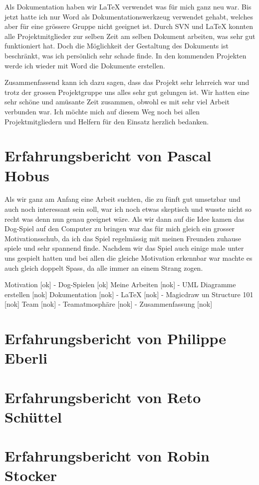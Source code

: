 \documentclass[12pt,halfparskip]{scrartcl}
\begin{document}
Als Dokumentation haben wir LaTeX verwendet was für mich ganz neu war. Bis jetzt hatte ich nur Word als Dokumentationswerkzeug verwendet gehabt, welches aber für eine grössere Gruppe nicht geeignet ist. Durch SVN und LaTeX konnten alle Projektmitglieder zur selben Zeit am selben Dokument arbeiten, was sehr gut funktioniert hat. Doch die Möglichkeit der Gestaltung des Dokuments ist beschränkt, was ich persönlich sehr schade finde. In den kommenden Projekten werde ich wieder mit Word die Dokumente erstellen.

Zusammenfassend kann ich dazu sagen, dass das Projekt sehr lehrreich war und trotz der grossen Projektgruppe uns alles sehr gut gelungen ist. Wir hatten eine sehr schöne und amüsante Zeit zusammen, obwohl es mit sehr viel Arbeit verbunden war. Ich möchte mich auf diesem Weg noch bei allen Projektmitgliedern und Helfern für den Einsatz herzlich bedanken.


\section{Erfahrungsbericht von Pascal Hobus}
Als wir ganz am Anfang eine Arbeit suchten, die zu fünft gut umsetzbar und auch noch interessant sein soll, war ich noch etwas skeptisch und wusste nicht so recht was denn nun genau geeignet wäre. Als wir dann auf die Idee kamen das Dog-Spiel auf den Computer zu bringen war das für mich gleich ein grosser Motivationsschub, da ich das Spiel regelmässig mit meinen Freunden zuhause spiele und sehr spannend finde. Nachdem wir das Spiel auch einige male unter uns gespielt hatten und bei allen die gleiche Motivation erkennbar war machte es auch gleich doppelt Spass, da alle immer an einem Strang zogen.


Motivation						[ok]
- Dog-Spielen					[ok]
Meine Arbeiten					[nok]
- UML Diagramme erstellen		[nok]
Dokumentation					[nok]
- LaTeX							[nok]
- Magicdraw un Structure 101	[nok]
Team							[nok]
- Teamatmosphäre				[nok]
- Zusammenfassung				[nok]

\section{Erfahrungsbericht von Philippe Eberli}

\section{Erfahrungsbericht von Reto Schüttel}

\section{Erfahrungsbericht von Robin Stocker}
\end{document}
